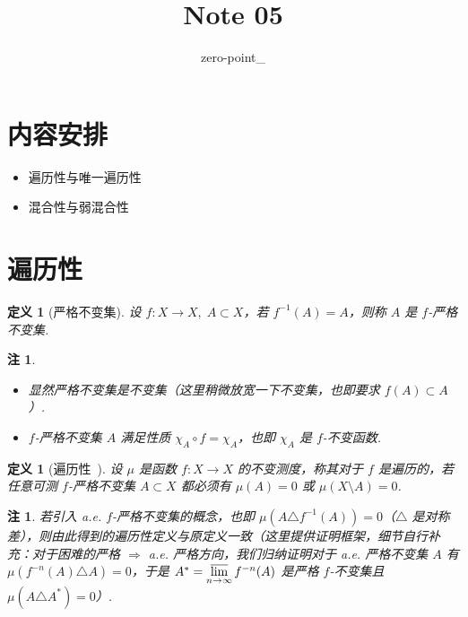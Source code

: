 \documentclass[11pt, a4paper, oneside]{ctexart}
\title{Note 05}
\author{zero-point\_}
\newtheorem{definition}[theorem]{定义}
\newtheorem{remark}[theorem]{注}
\begin{document}
	\maketitle
    \section{内容安排}
    \begin{itemize}
        \item 遍历性与唯一遍历性
        \item 混合性与弱混合性
    \end{itemize}

    \section{遍历性}
    \begin{definition}[严格不变集]
        设 $f:X\to X,\; A\subset X$，若 $f^{-1}(A)=A$，则称 $A$ 是 $f$-严格不变集.
    \end{definition}
    \begin{remark}
        \begin{itemize}
            \item 显然严格不变集是不变集（这里稍微放宽一下不变集，也即要求 $f(A)\subset A$）.
            \item $f$-严格不变集 $A$ 满足性质 $\chi_A\circ f=\chi_A$，也即 $\chi_A$ 是 $f$-不变函数.
        \end{itemize}
    \end{remark}

    \begin{definition}[遍历性~\uppercase\expandafter{}]
        设 $\mu$ 是函数 $f:X\to X$ 的不变测度，称其对于 $f$ 是遍历的，若任意可测 $f$-严格不变集 $A\subset X$ 都必须有 $\mu(A)=0$ 或 $\mu(X\setminus A)=0$.
    \end{definition}
    \begin{remark}
        若引入 a.e. $f$-严格不变集的概念，也即 $\mu(A\triangle f^{-1}(A))=0$（$\triangle$ 是对称差），则由此得到的遍历性定义与原定义一致（这里提供证明框架，细节自行补充：对于困难的严格 $\Rightarrow$ a.e. 严格方向，我们归纳证明对于 a.e. 严格不变集 $A$ 有 $\mu(f^{-n}(A)\triangle A)=0$，于是 $A^*=\varlimsup\limits_{n\to\infty}f^{-n}(A)$ 是严格 $f$-不变集且 $\mu(A\triangle A^*)=0$）.
    \end{remark}
\end{document}
